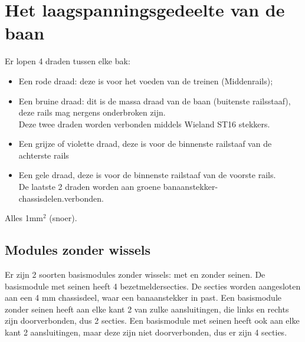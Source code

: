 \documentclass[12pt,a4paper]{report}
\begin{document}
\section{Het laagspanningsgedeelte van de baan}

Er lopen 4 draden tussen elke bak:
\begin{itemize}
\item Een rode draad: deze is voor het voeden van de treinen (Middenrails);
\item Een bruine draad: dit is de massa draad van de baan (buitenste railsstaaf), deze rails mag nergens onderbroken zijn.
\\
Deze twee draden worden verbonden middels Wieland ST16 stekkers.

\item Een grijze of violette draad, deze is voor de binnenste railstaaf van de achterste rails
\item Een gele draad, deze is voor de binnenste railstaaf van de voorste rails.\\
De laatste 2 draden worden aan groene banaanstekker-chassisdelen.verbonden.
\end{itemize}
Alles 1mm$^{2}$ (snoer). 

\subsection{Modules zonder wissels}
Er zijn 2 soorten basismodules zonder wissels: met en zonder seinen. De basismodule met seinen heeft 4 bezetmeldersecties.
De secties worden aangesloten aan een 4 mm chassisdeel, waar een banaanstekker in past.
Een basismodule zonder seinen heeft aan elke kant 2 van zulke aansluitingen, die links en rechts zijn doorverbonden, dus 2 secties.
Een basismodule met seinen heeft ook aan elke kant 2 aansluitingen, maar deze zijn niet doorverbonden, dus er zijn 4 secties.
\end{document}
